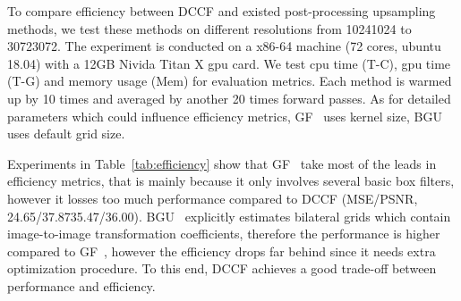 \documentclass[runningheads]{llncs}
\begin{document}
To compare efficiency between DCCF and existed post-processing upsampling methods, we test these methods on different resolutions from 10241024 to 30723072.
The experiment is conducted on a x86-64 machine (72 cores, ubuntu 18.04) with a 12GB Nivida Titan X gpu card.
We test cpu time (T-C), gpu time (T-G) and memory usage (Mem) for evaluation metrics.
Each method is warmed up by 10 times and averaged by another 20 times forward passes.
As for detailed parameters which could influence efficiency metrics, GF~\cite{hekaiming2013GF} uses  kernel size, BGU~\cite{chen2016bilateral} uses default  grid size.

Experiments in Table~\ref{tab:efficiency} show that GF~\cite{hekaiming2013GF} take most of the leads in efficiency metrics, that is mainly because it only involves several basic box filters, however it losses too much performance compared to DCCF (MSE/PSNR, 24.65/37.8735.47/36.00). 
BGU~\cite{chen2016bilateral} explicitly estimates bilateral grids which contain image-to-image transformation coefficients, therefore the performance is higher compared to GF~\cite{hekaiming2013GF}, however the efficiency drops far behind since it needs extra optimization procedure.
To this end, DCCF achieves a good trade-off between performance and efficiency.
\end{document}

